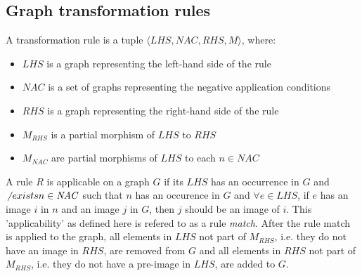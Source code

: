 \subsection{Graph transformation rules}\label{sec:graph_rules}
\begin{definition}
A transformation rule is a tuple $\langle \mathit{LHS}, \mathit{NAC}, \mathit{RHS}, \mathit{M}\rangle$, where:
\begin{itemize}
  \item $\mathit{LHS}$ is a graph representing the left-hand side of the rule
  \item $\mathit{NAC}$ is a set of graphs representing the negative application conditions
  \item $\mathit{RHS}$ is a graph representing the right-hand side of the rule
  \item $\mathit{M_{RHS}}$ is a partial morphism of $\mathit{LHS}$ to $\mathit{RHS}$ 
  \item $\mathit{M_{NAC}}$ are partial morphisms of $\mathit{LHS}$ to each $n \in \mathit{NAC}$
\end{itemize}
\end{definition}

A rule $R$ is applicable on a graph $G$ if its $\mathit{LHS}$ has an occurrence in $G$ and $\not\ exists n \in \mathit{NAC}$ such that $n$ has an occurence in $G$ and $\forall e \in \mathit{LHS}$, if $e$ has an image $i$ in $n$ and an image $j$ in $G$, then $j$ should be an image of $i$. This 'applicability' as defined here is refered to as a rule \textit{match}. After the rule match is applied to the graph, all elements in $\mathit{LHS}$ not part of $\mathit{M_{RHS}}$, i.e. they do not have an image in $\mathit{RHS}$, are removed from $G$ and all elements in $\mathit{RHS}$ not part of $\mathit{M_{RHS}}$, i.e. they do not have a pre-image in $\mathit{LHS}$, are added to $G$.

